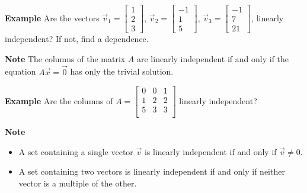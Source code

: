   \begin{frame}[fragile]
\textbf{Example}
 Are the vectors 
$\vec{v}_1 = \left[\begin{array}{r} 1 \\2 \\3 \end{array}\right] $, 
$\vec{v}_2 = \left[\begin{array}{r} -1 \\ 1 \\ 5 \end{array}\right] $, 
$\vec{v}_3 = \left[\begin{array}{r} -1 \\ 7 \\ 21 \end{array}\right] $, 
linearly independent?  If not, find a dependence.

\end{frame}

  \begin{frame}[fragile]
\textbf{Note}
The columns of the matrix $A$ are linearly independent if and 
only if the equation $A \vec{x} = \vec{0}$ has only the trivial solution.


\textbf{Example}
Are the columns of $A = 
\left[\begin{array}{rrr}
 0 & 0 & 1 \\ 
 1 & 2 & 2 \\
 5 & 3 & 3 \\
\end{array}\right]
$
linearly independent?

\end{frame}

  \begin{frame}[fragile]
\textbf{Note}
\begin{itemize}
\item A set containing a single vector $\vec{v}$ is linearly independent
if and only if $\vec{v} \neq 0$.
\item A set containing two vectors is linearly independent if and only if neither
vector is a multiple of the other.
\end{itemize}

%
%
%
%
\end{frame}

